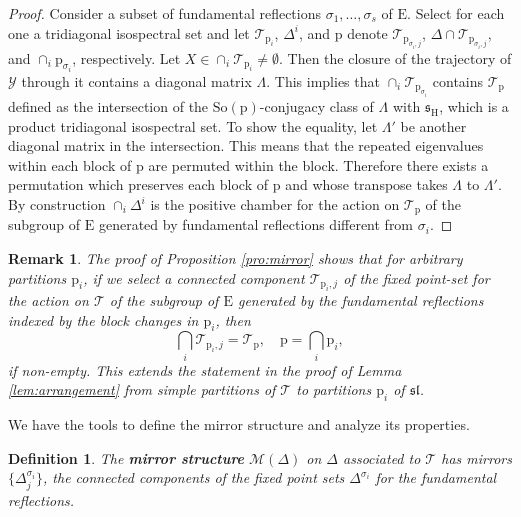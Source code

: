 \documentclass[reqno]{amsart}
\newcommand{\p}{\mathrm{p}}
\renewcommand{\ss}{\mathfrak{s}}
\renewcommand{\sl}{\mathfrak{sl}}
\newcommand{\cM}{\mathcal{M}}
\newcommand{\cT}{\mathcal{T}}
\newcommand{\cY}{\mathcal{Y}}
\newcommand{\E}{\mathrm{E}}
\newcommand{\So}{\mathrm{So}}
\renewcommand{\H}{\mathrm{H}}
\newtheorem{definition}[theorem]{Definition}
\newtheorem{remark}[theorem]{Remark}
\begin{document}
\begin{proof}
Consider a subset of fundamental reflections $\sigma_1,\dots,\sigma_s$ of $\mathrm{E}$. Select for each one a tridiagonal isospectral set and let  $\cT_{\p_i}$, $\Delta^i$, and $\p$ denote $\cT_{\p_{\sigma_i,j}}$, $\Delta\cap \cT_{\p_{\sigma_i,j}}$, and  $\cap_i\p_{\sigma_i}$, respectively.
Let $X\in \cap_i \cT_{\p_i}\neq \emptyset$. Then
 the closure of the trajectory of $\cY$ through it contains a diagonal matrix $\Lambda$. This implies that
$\cap_{i} \cT_{\p_{\sigma_i}}$ contains $\cT_\p$ defined as the intersection of the $\So(\p)$-conjugacy class of $\Lambda$ with $\ss_\H$, which is a product tridiagonal isospectral set.
To show the equality, let $\Lambda'$ be another diagonal matrix in the intersection. This means that
the repeated eigenvalues within each block of $\p$ are permuted within the block. Therefore there exists a permutation which preserves each block  of $\p$ and whose transpose takes $\Lambda$ to $\Lambda'$.
By construction $\cap_{i} \Delta^i$ is the positive chamber for the action on $\cT_\p$ of the subgroup of $\E$
generated by fundamental reflections different from $\sigma_i$.
\end{proof}
\begin{remark}\label{rem:connected-intersection}
The proof of Proposition \ref{pro:mirror} shows that for arbitrary partitions $\p_i$, if we select  a connected component $\cT_{\p_i,j}$ of the fixed point-set for the action on $\cT$ of the subgroup of $\E$ generated by the fundamental reflections indexed by the block changes in $\p_i$, then
\[\bigcap_i\cT_{\p_i,j}=\cT_\p,\quad \p=\bigcap_i\p_i,\]
if non-empty. This extends the statement in the proof of Lemma \ref{lem:arrangement} from simple partitions of $\cT$ to  partitions $\p_i$ of $\sl$.
\end{remark}

We have the tools to define the mirror structure and analyze its properties.

\begin{definition}\label{def:mirror} The {\bf mirror structure} $\cM(\Delta)$ on $\Delta$ associated to $\cT$ has mirrors $\{\Delta^{\sigma_i}_j\}$, the connected components of the fixed point sets $\Delta^{\sigma_i}$ for the fundamental reflections.
\end{definition}
\end{document}
